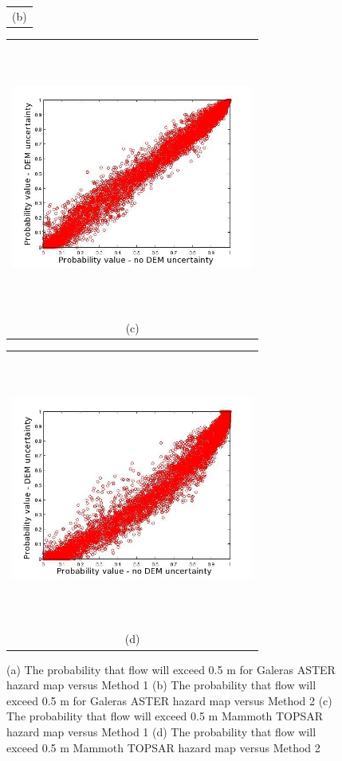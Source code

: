 \documentclass{article}
\newcommand{\Pic}[2][0.85]{\begin{center}\texttt{[image: \#2]}
 \end{center} }
\begin{document}
\begin{figure}[H]
\begin{minipage}{0.6\textwidth}
\begin{tabular}{c}
        (b)
        \end{tabular}
    \end{minipage} 
    \begin{minipage}[b]{0.6\textwidth}
        \begin{tabular}{c}
       \includegraphics[width=8cm,height=9cm,keepaspectratio]{figs/Mammoth_Topsar_vs_meth0.jpg}\\
        (c)
        \end{tabular}
    \end{minipage}
    \begin{minipage}{0.6\textwidth}
        \begin{tabular}{c}
	\includegraphics[width=8cm,height=9cm,keepaspectratio]{figs/Mammoth_Topsar_vs_meth3.jpg}\\
        (d)
        \end{tabular}
    \end{minipage} 
\caption{(a) The probability that flow will exceed 0.5 m for Galeras ASTER hazard map versus Method 1
(b) The probability that flow will exceed 0.5 m for Galeras ASTER hazard map versus Method 2 
(c) The probability that flow will exceed 0.5 m  Mammoth TOPSAR hazard map versus Method 1
(d) The probability that flow will exceed 0.5 m  Mammoth TOPSAR hazard map versus Method 2 }
\label{fig9}  
\end{figure}
\end{document}
